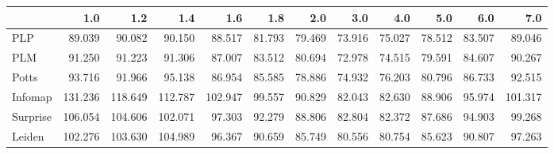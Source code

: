 \begin{tabular}{lrrrrrrrrrrr}
\toprule
{} &     1.0 &     1.2 &     1.4 &     1.6 &    1.8 &    2.0 &    3.0 &    4.0 &    5.0 &    6.0 &     7.0 \\
\midrule
PLP      &  89.039 &  90.082 &  90.150 &  88.517 & 81.793 & 79.469 & 73.916 & 75.027 & 78.512 & 83.507 &  89.046 \\
PLM      &  91.250 &  91.223 &  91.306 &  87.007 & 83.512 & 80.694 & 72.978 & 74.515 & 79.591 & 84.607 &  90.267 \\
Potts    &  93.716 &  91.966 &  95.138 &  86.954 & 85.585 & 78.886 & 74.932 & 76.203 & 80.796 & 86.733 &  92.515 \\
Infomap  & 131.236 & 118.649 & 112.787 & 102.947 & 99.557 & 90.829 & 82.043 & 82.630 & 88.906 & 95.974 & 101.317 \\
Surprise & 106.054 & 104.606 & 102.071 &  97.303 & 92.279 & 88.806 & 82.804 & 82.372 & 87.686 & 94.903 &  99.268 \\
Leiden   & 102.276 & 103.630 & 104.989 &  96.367 & 90.659 & 85.749 & 80.556 & 80.754 & 85.623 & 90.807 &  97.263 \\
\bottomrule
\end{tabular}
